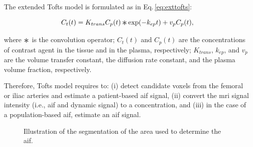 The extended Tofts model is formulated as in Eq.\,\eqref{eq:exttofts}:

\begin{equation}
  C_t(t) = K_{trans} C_p(t) \Conv \exp(-k_{ep}t) + v_p C_p(t),
  \label{eq:exttofts}
\end{equation}

\noindent where $\Conv$ is the convolution operator; $C_t(t)$ and $C_p(t)$ are the concentrations of contrast agent in the tissue and in the plasma, respectively; $K_{trans}$, $k_{ep}$, and $v_p$ are the volume transfer constant, the diffusion rate constant, and the plasma volume fraction, respectively.

Therefore, Tofts model requires to:
(i) detect candidate voxels from the femoral or iliac arteries and estimate a patient-based \ac{aif} signal,
(ii) convert the \ac{mri} signal intensity (i.e., \ac{aif} and dynamic signal) to a concentration, and
(iii) in the case of a population-based \ac{aif}, estimate an \ac{aif} signal.

\begin{figure}
  \centering
  \hspace*{\fill}
   \hfill
   \hfill
  \hspace*{\fill}
  \caption{Illustration of the segmentation of the area used to determine the \acs*{aif}.}
  \label{fig:aif}
\end{figure}

